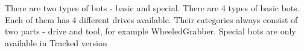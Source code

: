 There are two types of bots - basic and special.
There are 4 types of basic bots. Each of them has 4 different drives available.
Their categories always consist of two parts - drive and tool, for example WheeledGrabber.
Special bots are only available in Tracked version